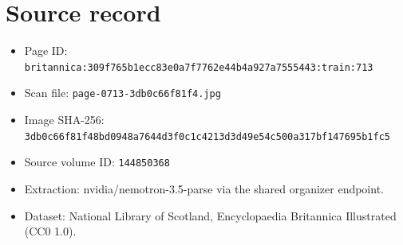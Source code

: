 \documentclass{article}
\begin{document}
\section*{Source record}
\begin{itemize}
\item Page ID: \texttt{britannica:309f765b1ecc83e0a7f7762e44b4a927a7555443:train:713}
\item Scan file: \texttt{page-0713-3db0c66f81f4.jpg}
\item Image SHA-256: \texttt{3db0c66f81f48bd0948a7644d3f0c1c4213d3d49e54c500a317bf147695b1fc5}
\item Source volume ID: \texttt{144850368}
\item Extraction: nvidia/nemotron-3.5-parse via the shared organizer endpoint.
\item Dataset: National Library of Scotland, Encyclopaedia Britannica Illustrated (CC0 1.0).
\end{itemize}
\end{document}
